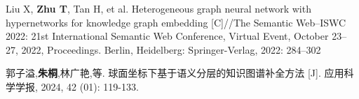 \achievement
\noindent
[1] Liu X, \textbf{Zhu T}, Tan H, et al. Heterogeneous graph neural network with hypernetworks
for knowledge graph embedding [C]//The Semantic Web–ISWC 2022: 21st International
Semantic Web Conference, Virtual Event, October 23–27, 2022, Proceedings. Berlin,
Heidelberg: Springer-Verlag, 2022: 284–302

\noindent
[2] 郭子溢,\textbf{朱桐},林广艳,等. 球面坐标下基于语义分层的知识图谱补全方法 [J]. 应用科学学报, 2024, 42 (01): 119-133.

